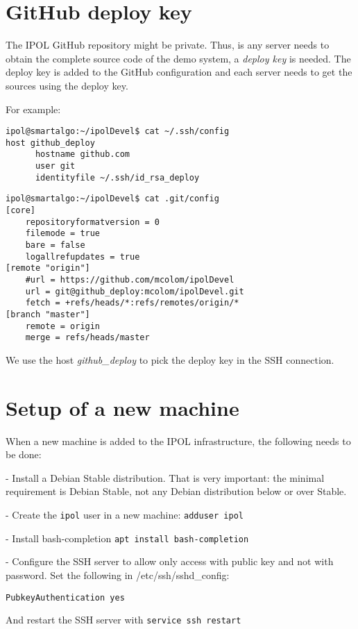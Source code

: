 \documentclass[a4paper,12pt]{article}
\begin{document}
\section{GitHub deploy key}
The IPOL GitHub repository might be private. Thus, is any server needs to obtain the complete source code of the demo system, a \emph{deploy key} is needed. The deploy key is added to the GitHub configuration and each server needs to get the sources using the deploy key.

For example:

\begin{verbatim}
ipol@smartalgo:~/ipolDevel$ cat ~/.ssh/config
host github_deploy
      hostname github.com
      user git
      identityfile ~/.ssh/id_rsa_deploy
\end{verbatim}

\vspace{0.15cm}

\begin{verbatim}
ipol@smartalgo:~/ipolDevel$ cat .git/config
[core]
	repositoryformatversion = 0
	filemode = true
	bare = false
	logallrefupdates = true
[remote "origin"]
	#url = https://github.com/mcolom/ipolDevel
	url = git@github_deploy:mcolom/ipolDevel.git
	fetch = +refs/heads/*:refs/remotes/origin/*
[branch "master"]
	remote = origin
	merge = refs/heads/master
\end{verbatim}

We use the host \emph{github\_deploy} to pick the deploy key in the SSH connection.

\section{Setup of a new machine}
When a new machine is added to the IPOL infrastructure, the following needs to be done:

- Install a Debian Stable distribution. That is very important: the minimal requirement is Debian Stable, not any Debian distribution below or over Stable.

- Create the {\tt ipol} user in a new machine: {\tt adduser ipol}

- Install bash-completion {\tt apt install bash-completion}

- Configure the SSH server to allow only access with public key and not with password. Set the following in /etc/ssh/sshd\_config:

{\tt PubkeyAuthentication yes}

And restart the SSH server with {\tt service ssh restart}
\end{document}
